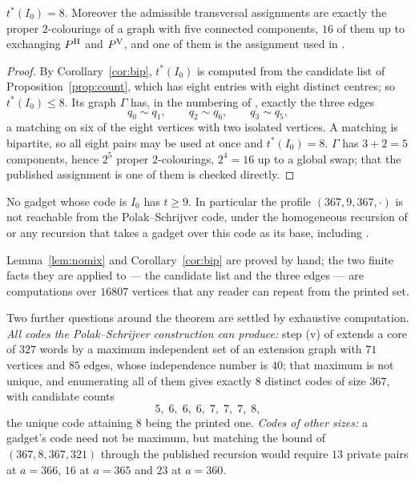 \begin{theorem}[proved]
\label{thm:main}
$t^*(I_0)=8$. Moreover the admissible transversal assignments are exactly the proper
$2$-colourings of a graph with five connected components, $16$ of them up to exchanging $P^{\mathrm H}$ and
$P^{\mathrm V}$, and one of them is the assignment used in \cite{itty2026,gao2026,bpz2026,tandon2026}.
\end{theorem}

\begin{proof}
By Corollary~\ref{cor:bip}, $t^*(I_0)$ is computed from the candidate list of
Proposition~\ref{prop:count}, which has eight entries with eight distinct centres; so
$t^*(I_0)\le 8$. Its graph $\Gamma$ has, in the numbering of \cite{gao2026}, exactly the three edges
\[
  q_0\sim q_1,\qquad q_2\sim q_6,\qquad q_3\sim q_5,
\]
a matching on six of the eight vertices with two isolated vertices. A matching is bipartite, so all
eight pairs may be used at once and $t^*(I_0)=8$. $\Gamma$ has $3+2=5$ components, hence $2^5$ proper
$2$-colourings, $2^4=16$ up to a global swap; that the published assignment is one of them is
checked directly.
\end{proof}

\begin{corollary}
No gadget whose code is $I_0$ has $t\ge 9$. In particular the profile $(367,9,367,\cdot)$ is not
reachable from the Polak--Schrijver code, under the homogeneous recursion of
\cite{gao2026,bpz2026} or any recursion that takes a gadget over this code as its base, including
\cite{tandon2026}.
\end{corollary}

Lemma~\ref{lem:nomix} and Corollary~\ref{cor:bip} are proved by hand; the two finite facts they are
applied to --- the candidate list and the three edges --- are computations over $16807$ vertices
that any reader can repeat from the printed set.

Two further questions around the theorem are settled by exhaustive computation. \emph{All codes the
Polak--Schrijver construction can produce:} step (v) of \cite{polak2019} extends a core of $327$
words by a maximum independent set of an extension graph with $71$ vertices and $85$ edges, whose
independence number is $40$; that maximum is not unique, and enumerating all of them gives exactly $8$
distinct codes of size $367$, with candidate counts
\[
  5,\;6,\;6,\;6,\;7,\;7,\;7,\;8 ,
\]
the unique code attaining $8$ being the printed one. \emph{Codes of other sizes:} a gadget's code need
not be maximum, but matching the bound of $(367,8,367,321)$ through the published recursion would
require $13$ private pairs at $a=366$, $16$ at $a=365$ and $23$ at $a=360$.

